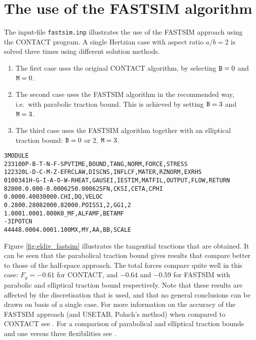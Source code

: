 \documentclass[12pt]{report}
\begin{document}
\section{The use of the FASTSIM algorithm}
\label{sec:ex_fastsim}

The input-file {\tt fastsim.inp} illustrates the use of the FASTSIM
approach using the CONTACT program. A single Hertzian case with aspect
ratio $a/b=2$ is solved three times using different solution methods.
\begin{enumerate}
\item The first case uses the original CONTACT algorithm, by selecting
        ${\tt B}=0$ and ${\tt M}=0$.
\item The second case uses the FASTSIM algorithm in the recommended way,
        i.e.\ with parabolic traction bound. This is achieved by setting
        ${\tt B}=3$ and ${\tt M}=3$.
\item The third case uses the FASTSIM algorithm together with an elliptical
        traction bound: ${\tt B}=0$ or 2, ${\tt M}=3$.
\end{enumerate}
\begin{alltt}\small
% second case: FASTSIM algorithm, parabolical traction bound (M=3, B=3)

 3 MODULE
  233100     P-B-T-N-F-S        PVTIME, BOUND , TANG  , NORM , FORCE, STRESS
  122320     L-D-C-M-Z-E        FRCLAW, DISCNS, INFLCF, MATER, RZNORM, EXRHS
 0100341   H-G-I-A-O-W-R  HEAT, GAUSEI, IESTIM, MATFIL, OUTPUT, FLOW, RETURN
   82000.     0.000     -0.000625   0.000625        FN, CKSI, CETA, CPHI
   0.000      0.400      30000.                     CHI, DQ, VELOC
   0.280      0.280      82000.     82000.          POISS 1,2,  GG 1,2
   1.000      1.000      1.000                      K0_MF,ALFAMF,BETAMF
   -3                                               IPOTCN
   44   44     8.000      4.000      1.100          MX,MY,AA,BB,SCALE
\end{alltt}
Figure \ref{fig:eldiv_fastsim} illustrates the tangential tractions that
are obtained. It can be seen that the parabolical traction bound gives
results that compare better to those of the half-space approach. The total
forces compare quite well in this case: $F_y=-0.61$ for CONTACT, and
$-0.64$ and $-0.59$ for FASTSIM with parabolic and elliptical traction bound
respectively. Note that these results are affected by the discretisation
that is used, and that no general conclusions can be drawn on basis of a
single case. For more information on the accuracy of the FASTSIM approach
(and USETAB, Polach's method) when compared to CONTACT see
\cite{Vollebregt2011a-assessm}. For a comparison of parabolical and elliptical
traction bounds and one versus three flexibilities see
\cite{Vollebregt2010b-fastsim2}.
\end{document}
